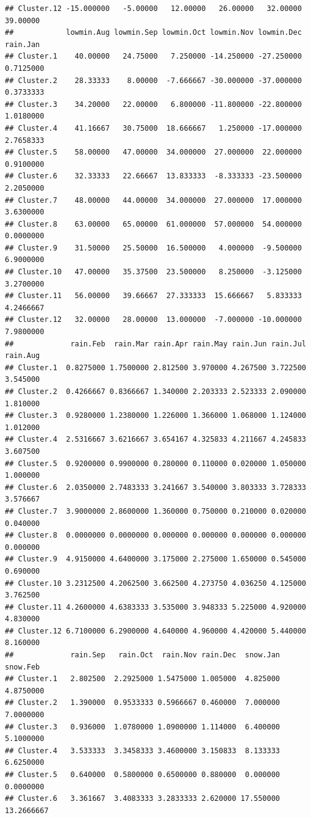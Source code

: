 \documentclass[
]{article}
\begin{document}
\begin{verbatim}
## Cluster.12 -15.000000   -5.00000   12.00000   26.00000   32.00000   39.00000
##            lowmin.Aug lowmin.Sep lowmin.Oct lowmin.Nov lowmin.Dec  rain.Jan
## Cluster.1    40.00000   24.75000   7.250000 -14.250000 -27.250000 0.7125000
## Cluster.2    28.33333    8.00000  -7.666667 -30.000000 -37.000000 0.3733333
## Cluster.3    34.20000   22.00000   6.800000 -11.800000 -22.800000 1.0180000
## Cluster.4    41.16667   30.75000  18.666667   1.250000 -17.000000 2.7658333
## Cluster.5    58.00000   47.00000  34.000000  27.000000  22.000000 0.9100000
## Cluster.6    32.33333   22.66667  13.833333  -8.333333 -23.500000 2.2050000
## Cluster.7    48.00000   44.00000  34.000000  27.000000  17.000000 3.6300000
## Cluster.8    63.00000   65.00000  61.000000  57.000000  54.000000 0.0000000
## Cluster.9    31.50000   25.50000  16.500000   4.000000  -9.500000 6.9000000
## Cluster.10   47.00000   35.37500  23.500000   8.250000  -3.125000 3.2700000
## Cluster.11   56.00000   39.66667  27.333333  15.666667   5.833333 4.2466667
## Cluster.12   32.00000   28.00000  13.000000  -7.000000 -10.000000 7.9800000
##             rain.Feb  rain.Mar rain.Apr rain.May rain.Jun rain.Jul rain.Aug
## Cluster.1  0.8275000 1.7500000 2.812500 3.970000 4.267500 3.722500 3.545000
## Cluster.2  0.4266667 0.8366667 1.340000 2.203333 2.523333 2.090000 1.810000
## Cluster.3  0.9280000 1.2380000 1.226000 1.366000 1.068000 1.124000 1.012000
## Cluster.4  2.5316667 3.6216667 3.654167 4.325833 4.211667 4.245833 3.607500
## Cluster.5  0.9200000 0.9900000 0.280000 0.110000 0.020000 1.050000 1.000000
## Cluster.6  2.0350000 2.7483333 3.241667 3.540000 3.803333 3.728333 3.576667
## Cluster.7  3.9000000 2.8600000 1.360000 0.750000 0.210000 0.020000 0.040000
## Cluster.8  0.0000000 0.0000000 0.000000 0.000000 0.000000 0.000000 0.000000
## Cluster.9  4.9150000 4.6400000 3.175000 2.275000 1.650000 0.545000 0.690000
## Cluster.10 3.2312500 4.2062500 3.662500 4.273750 4.036250 4.125000 3.762500
## Cluster.11 4.2600000 4.6383333 3.535000 3.948333 5.225000 4.920000 4.830000
## Cluster.12 6.7100000 6.2900000 4.640000 4.960000 4.420000 5.440000 8.160000
##             rain.Sep   rain.Oct  rain.Nov rain.Dec  snow.Jan   snow.Feb
## Cluster.1   2.802500  2.2925000 1.5475000 1.005000  4.825000  4.8750000
## Cluster.2   1.390000  0.9533333 0.5966667 0.460000  7.000000  7.0000000
## Cluster.3   0.936000  1.0780000 1.0900000 1.114000  6.400000  5.1000000
## Cluster.4   3.533333  3.3458333 3.4600000 3.150833  8.133333  6.6250000
## Cluster.5   0.640000  0.5800000 0.6500000 0.880000  0.000000  0.0000000
## Cluster.6   3.361667  3.4083333 3.2833333 2.620000 17.550000 13.2666667

\end{verbatim}
\end{document}
